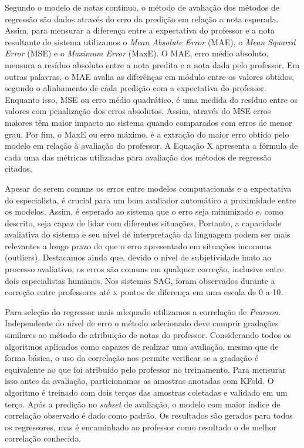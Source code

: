\begin{minipage}[!h]{0.45\textwidth}
Segundo o modelo de notas contínuo, o método de avaliação dos métodos de regressão são dados através do erro da predição em relação a nota esperada. Assim, para mensurar a diferença entre a expectativa do professor e a nota resultante do sistema utilizamos o \textit{Mean Absolute Error} (MAE), o \textit{Mean Squared Error} (MSE) e o \textit{Maximum Error} (MaxE). O MAE, erro médio absoluto, mensura a resíduo absoluto entre a nota predita e a nota dada pelo professor. Em outras palavras, o MAE avalia as diferênças em módulo entre os valores obtidos, segundo o alinhamento de cada predição com a expectativa do professor. Enquanto isso, MSE ou erro médio quadrático, é uma medida do resíduo entre os valores com penalização dos erros absolutos. Assim, através do MSE erros maiores têm maior impacto no sistema quando comparados com erros de menor grau. Por fim, o MaxE ou erro máximo, é a extração do maior erro obtido pelo modelo em relação à avaliação do professor. A Equação X apresenta a fórmula de cada uma das métricas utilizadas para avaliação dos métodos de regressão citados.


Apesar de serem comuns os erros entre modelos computacionais e a expectativa do especialista, é crucial para um bom avaliador automático a proximidade entre os modelos. Assim, é esperado ao sistema que o erro seja minimizado e, como descrito, seja capaz de lidar com diferentes situações. Portanto, a capacidade avaliativa do sistema e seu nível de interpretação da linguagem podem ser mais relevantes a longo prazo do que o erro apresentado em situações incomuns (outliers). Destacamos ainda que, devido o nível de subjetividade inato ao processo avaliativo, os erros são comuns em qualquer correção, inclusive entre dois especialistas humanos. Nos sistemas SAG, foram observados durante a correção entre professores até x pontos de diferença em uma escala de 0 a 10. 

Para seleção do regressor mais adequado utilizamos a correlação de \textit{Pearson}. Independente do nível de erro o método selecionado deve cumprir gradações similares ao método de atribuição de notas do professor. Considerando todos os algoritmos aplicados como capazes de realizar uma avaliação, mesmo que de forma básica, o uso da correlação nos permite verificar se a gradação é equivalente ao que foi atribuído pelo professor no treinamento. Para mensurar isso antes da avaliação, particionamos as amostras anotadas com KFold. O algoritmo é treinado com dois terços das amostras coletadas e validado em um terço. Após a predição no \textit{subset} de avaliação, o modelo com maior índice de correlação observado é dado como padrão. Os resultados são gerados para todos os regressores, mas é encaminhado ao professor como resultado o de melhor correlação conhecida.


\end{minipage}
